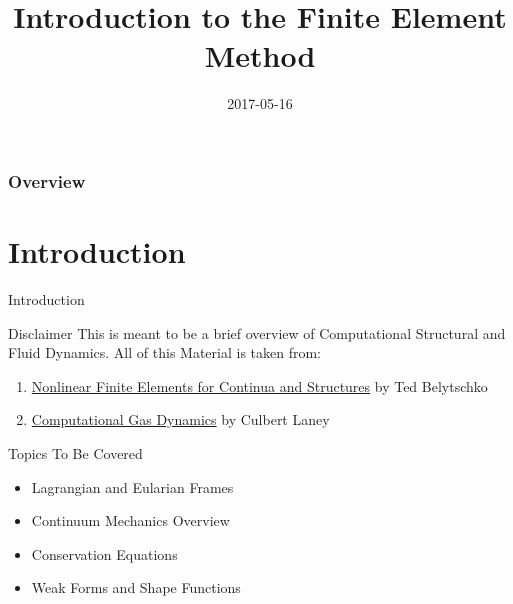 \documentclass{beamer}
\title{Introduction to the Finite Element Method}
\institute{NONE}
\date{2017-05-16}
\begin{document}
\frame{\titlepage}
\begin{frame}
	\frametitle{Overview} 
	\tableofcontents
\end{frame}
\section{Introduction}
\begin{frame}{Introduction}
\begin{block}{Disclaimer}
	This is meant to be a brief overview of Computational Structural and Fluid Dynamics.
	All of this Material is taken from:
	\begin{enumerate}
		\item \underline{Nonlinear Finite Elements for Continua and Structures} by Ted Belytschko 
		\item \underline{Computational Gas Dynamics} by Culbert Laney
	\end{enumerate}
\end{block}
\begin{block}{Topics To Be Covered}
\begin{itemize}
	\item Lagrangian and Eularian Frames
	\item Continuum Mechanics Overview
	\item Conservation Equations
	\item Weak Forms and Shape Functions
\end{itemize}
\end{block}
\end{frame}
\end{document}
